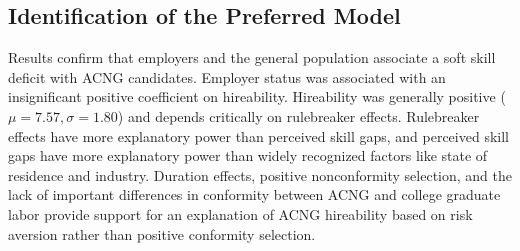 \documentclass[review]{elsarticle}
\begin{document}



\subsection{Identification of the Preferred Model}

Results confirm that employers and the general population associate a soft skill deficit with ACNG candidates.
Employer status was associated with an insignificant positive coefficient on hireability.
Hireability was generally positive ($\mu = 7.57, \sigma = 1.80$) and depends critically on rulebreaker effects.
Rulebreaker effects have more explanatory power than perceived skill gaps,
and perceived skill gaps have more explanatory power than widely recognized factors like state of residence and industry.
Duration effects, positive nonconformity selection,
and the lack of important differences in conformity between ACNG and college graduate labor
provide support for an explanation of ACNG hireability based on risk aversion rather than positive conformity selection.
\end{document}
